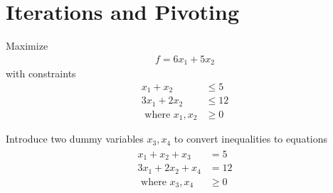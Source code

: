 \documentclass[journal,12pt,twocolumn]{IEEEtran}
\begin{document}
\section{Iterations and Pivoting}
\begin{problem}
Maximize
\begin{align}
f = 6x_1 + 5x_2 
\end{align}
with constraints
\begin{align}
x_1 + x_2 &\leq 5 \nonumber \\
3x_1 + 2x_2 &\leq 12 \nonumber \\
\text{ where } x_1,x_2 &\geq 0 \nonumber
\end{align}
\end{problem}
\solution
Introduce two dummy variables $x_3,x_4$ to convert inequalities to equations 
\begin{align}
\label{eq:slack}
\begin{split}
x_1 + x_2 + x_3 &= 5 \\
3x_1 + 2x_2 + x_4 &= 12 \\ 
\text{ where } x_3,x_4 &\geq 0 
\end{split}
\end{align}
\end{document}
